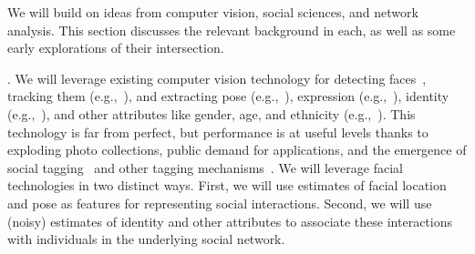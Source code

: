 \label{sec:background}

We will build on ideas from computer vision, social sciences, and network analysis. This section discusses the relevant background in each, as well as some early explorations of their intersection.


. We will leverage existing computer vision technology for detecting faces~\cite{ViolaJones,Zhang:detect}, tracking them (e.g.,~\cite{Comaniciu:track}), and extracting pose (e.g.,~\cite{Hanson,Murphy-Chutorian:pose}), expression (e.g.,~\cite{Matthews:AAM,Lucey:AAM,Mumford:face,Yacoob:expression,delaTorre:expression,Essa:expression}), identity (e.g.,~\cite{Chellappa:face}), and other attributes like gender, age, and ethnicity (e.g.,~\cite{LNCS53050340}).  This technology is far from perfect, but performance is at useful levels thanks to exploding photo collections, public demand for applications, and the emergence of social tagging~\cite{Stone2008,Stone2010} and other tagging mechanisms~\cite{berg2004naf,berg2005sp,Everingham06a,huang:lfw,YangBKR12}. 
We will leverage facial technologies in two distinct ways. First, we will use estimates of facial location and pose as features for representing social interactions. Second, we will use (noisy) estimates of identity and other attributes to associate these interactions with individuals in the underlying social network. 


